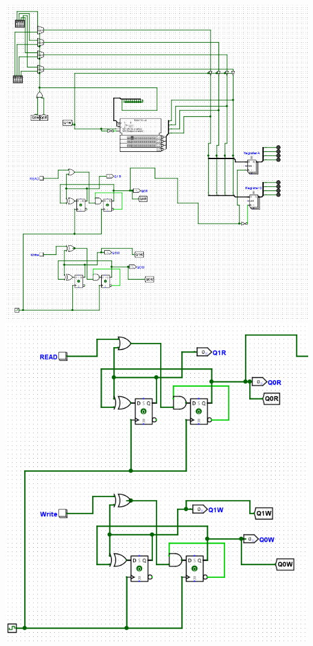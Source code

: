 \documentclass{article}
\begin{document}
        \begin{center}
            \includegraphics[width=1\textwidth]{Circuit.png}
            \includegraphics[width=1\textwidth]{FSM_Circuits.png}

\end{center}
\end{document}
